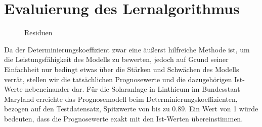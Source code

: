 \documentclass[12pt, a4paper]{article}
\begin{document}
\begin{table}[h]
\begin{center}

\end{center}
\caption{Hyperparameter der für diese Arbeit verwendeten Solaranlagen}
\label{tab:temperaturkoeffizienten} 
\end{table}

\newpage

\section{Evaluierung des Lernalgorithmus}
\label{sec:evaluation}



\begin{figure}[H]
\centering
\def\svgwidth{400pt}

\caption{Residuen }
\label{fig:residuals}
\end {figure}

Da der Determinierungskoeffizient zwar eine äußerst hilfreiche Methode ist, um die Leistungsfähigkeit des Modells zu bewerten, jedoch auf Grund seiner Einfachheit nur bedingt etwas über die Stärken und Schwächen des Modells verrät, stellen wir die tatsächlichen Prognosewerte und die dazugehörigen Ist-Werte nebeneinander dar. Für die Solaranlage in Linthicum im Bundesstaat Maryland erreichte das Prognosemodell beim Determinierungskoeffizienten, bezogen auf den Testdatensatz, Spitzwerte von bis zu 0.89. Ein Wert von 1 würde bedeuten, dass die Prognosewerte exakt mit den Ist-Werten übereinstimmen. 
\end{document}
